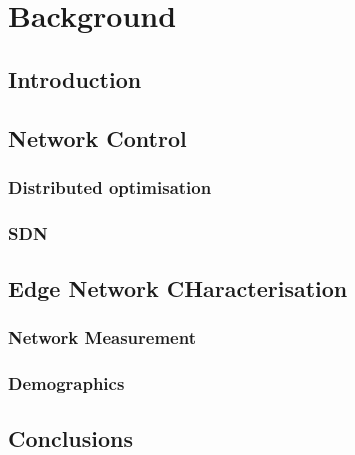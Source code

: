 \chapter{Background}
\ifpdf
    \graphicspath{{Background/BackgroundFigs/PNG/}{Chapter3/BackgroundFigs/PDF/}{Background/BackgroundFigs/}}
\else
    \graphicspath{{Background/BackgroundFigs/EPS/}{Background/BackgroundFigs/}}
\fi

\section{Introduction}

\section{Network Control}
\subsection{Distributed optimisation}
\subsection{SDN}

\section{Edge Network CHaracterisation}
\subsection{Network Measurement}
\subsection{Demographics}

\section{Conclusions}
